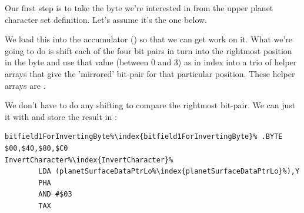 Our first step is to take the byte we're interested in from the upper planet character set
definition. Let's assume it's the one below.

\begin{figure}[H]
  {
    \setlength{\tabcolsep}{3.0pt}
    \setlength\cmidrulewidth{\lightrulewidth} %
    \begin{adjustbox}{width=4cm,center}
    \end{adjustbox}
  }
\end{figure}
\vspace{-0.7cm}
We load this into the accumulator () so that we can get work on it. What we're going to
do is shift each of the four bit pairs in turn into the rightmost position in the byte and use
that value (between 0 and 3) as in index into a trio of helper arrays that give the 'mirrored'
bit-pair for that particular position. These helper arrays are .

We don't have to do any shifting to compare the rightmost bit-pair. We can just  it with
 and store the result in :

\begin{lstlisting}[escapechar=\%]
bitfield1ForInvertingByte%\index{bitfield1ForInvertingByte}% .BYTE $00,$40,$80,$C0
InvertCharacter%\index{InvertCharacter}%
        LDA (planetSurfaceDataPtrLo%\index{planetSurfaceDataPtrLo}%),Y
        PHA
        AND #$03
        TAX
\end{lstlisting}


